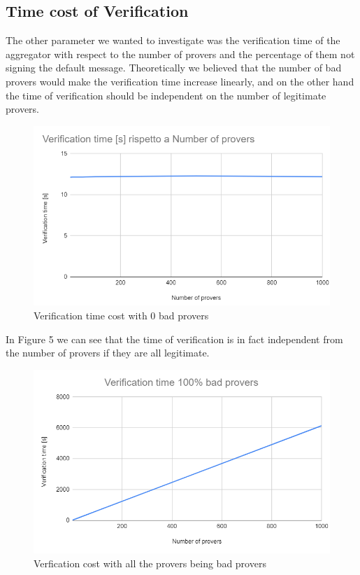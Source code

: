 \documentclass[10pt, a4paper, twocolumn]{article} %
\begin{document}
\subsection{Time cost of Verification}
The other parameter we wanted to investigate was the verification time of the aggregator with respect to the number of provers and the percentage of them not signing the default message.
Theoretically we believed that the number of bad provers would make the verification time increase linearly, and on the other hand the time of verification should be independent on the number of legitimate provers.\\

\begin{figure}
	\includegraphics[width=\linewidth]{images/Verification_0.png} %
	\caption{Verification time cost with 0 bad provers} %
	\label{bear} %
\end{figure}
In Figure 5 we can see that the time of verification is in fact independent from the number of provers if they are all legitimate.\\
\begin{figure}
	\includegraphics[width=\linewidth]{images/verification_100.png} %
	\caption{Verfication cost with all the provers being bad provers} %
	\label{bear} %
\end{figure}
\end{document}
